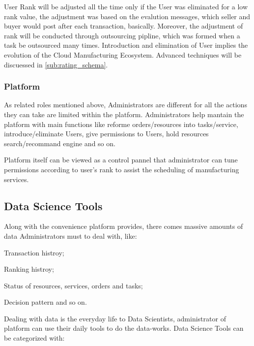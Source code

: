 User Rank will be adjusted all the time only if the User was eliminated for a low rank value, the adjustment was based on the evalution messages, which seller and buyer would post after each transaction, basically. Moreover, the adjustment of rank will be conducted through outsourcing pipline, which was formed when a task be outsourced many times. Introduction and elimination of User implies the evolution of the Cloud Manufacturing Ecosystem. Advanced techniques will be discuessed in \autoref{sub:rating_schema}.

\subsubsection{Platform}
As related roles mentioned above, Administrators are different for all the actions they can take are limited within the platform. Administrators help mantain the platform with main functions like reforme orders/resources into tasks/service, introduce/eliminate Users, give permissions to Users, hold resources search/recommand engine and so on.

Platform itself can be viewed as a control pannel that administrator can tune permissions according to user's rank to assist the scheduling of manufacturing services. 

\subsection{Data Science Tools}
Along with the convenience platform provides, there comes massive amounts of data Administrators must to deal with, like:
\begin{inparaenum}[1)]
  \item Transaction histroy;
  \item Ranking histroy;
  \item Status of resources, services, orders and tasks;
  \item Decision pattern and so on.
\end{inparaenum}

Dealing with data is the everyday life to Data Scientists, administrator of platform can use their daily tools to do the data-works. Data Science Tools can be categorized with:

